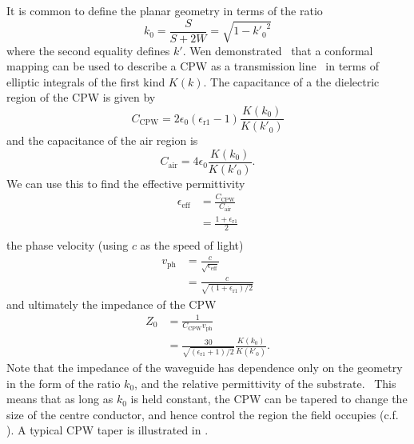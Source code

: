 It is common to define the planar geometry in terms of the
ratio~\cite{1127105, Simons2004}
\begin{equation}
  k_0 = \frac{S}{S+2W} = \sqrt{1-{k'_0}^2}
  \label{eqn:k0def}
\end{equation}
where the second equality defines $k'$.
%
Wen demonstrated~\cite{1127105} that a conformal mapping can be used to describe
a CPW as a transmission line~\cite{Jackson1975} in terms of elliptic integrals
of the first kind $K(k)$. The capacitance of a the dielectric region of the CPW
is given by
\begin{equation}
  C_\mathrm{CPW} = 2\epsilon_0(\epsilon_\mathrm{r1}-1)\frac{K(k_0)}{K(k'_0)}
\end{equation}
and the capacitance of the air region is
\begin{equation}
  C_\mathrm{air} = 4\epsilon_0 \frac{K(k_0)}{K(k'_0)}.
\end{equation}
We can use this to find the effective permittivity 
\begin{align}
  \epsilon_\mathrm{eff} &= \frac{C_\mathrm{CPW}}{C_\mathrm{air}} \\
    &= \frac{1+ \epsilon_\mathrm{r1}}{2} \\
\end{align}
the phase velocity (using $c$ as the speed of light)
\begin{align}
  v_\mathrm{ph} &= \frac{c}{\sqrt{\epsilon_\mathrm{eff}}} \\
    &= \frac{c}{\sqrt{(1 + \epsilon_\mathrm{r1})/2}}
\end{align}
and ultimately the impedance of the CPW
\begin{align}
  Z_0 &= \frac{1}{C_\mathrm{CPW} v_\mathrm{ph}} \\
    &= \frac{30}{\sqrt{(\epsilon_\mathrm{r1}+1)/2}} \frac{K(k_0)}{K(k'_0)}.
\end{align}
Note that the impedance of the waveguide has dependence only on the geometry in
the form of the ratio $k_0$, and the relative permittivity of the
substrate.~\cite{Simons2004} This means that as long as $k_0$ is held constant,
the CPW can be tapered to change the size of the centre conductor, and hence
control the region the field occupies (c.f. ).
A typical CPW taper is illustrated in
.~

\begin{figure}
  \caption{
  }
  \label{experiment:fig:CPWtaper}
\end{figure}

